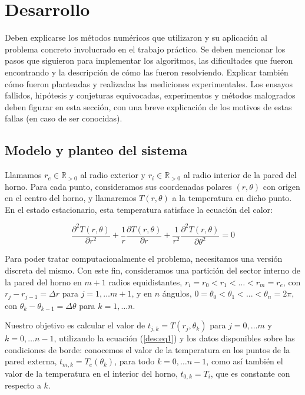 \section{Desarrollo}

  {\color{Gray} Deben explicarse los métodos numéricos que utilizaron y su aplicación al problema concreto involucrado en el trabajo práctico. Se deben mencionar los pasos que siguieron para implementar los algoritmos, las dificultades que fueron encontrando y la descripción de cómo las fueron resolviendo. Explicar también cómo fueron planteadas y realizadas las mediciones experimentales. Los ensayos fallidos, hipótesis y conjeturas equivocadas, experimentos y métodos malogrados deben figurar en esta sección, con una breve explicación de los motivos de estas fallas (en caso de ser conocidas).}

  \subsection{Modelo y planteo del sistema}

    Llamamos $r_e \in \mathbb{R}_{>0}$ al radio exterior y $r_i \in \mathbb{R}_{>0}$ al radio interior de la pared del horno. Para cada punto, consideramos sus coordenadas polares $(r, \theta)$ con origen en el centro del horno, y llamaremos $T(r, \theta)$ a la temperatura en dicho punto. En el estado estacionario, esta temperatura satisface la ecuación del calor:

    \begin{equation} \label{des:eq1}
      \frac{\partial^2 T(r, \theta)}{\partial r^2} + \frac{1}{r} \frac{\partial T(r, \theta)}{\partial r} + \frac{1}{r^2} \frac{\partial^2 T(r, \theta)}{\partial \theta^2} = 0
    \end{equation}

    Para poder tratar computacionalmente el problema, necesitamos una versión discreta del mismo. Con este fin, consideramos una partición del sector interno de la pared del horno en $m + 1$ radios equidistantes, $r_i = r_0 < r_1 < \dots < r_m = r_e$, con $r_j - r_{j-1} = \Delta r$ para $j = 1, \dots m+1$, y en $n$ ángulos, $0 = \theta_0 < \theta_1 < ... < \theta_n = 2\pi$, con $\theta_k - \theta_{k-1} = \Delta \theta$ para $k = 1, \dots n$.

    Nuestro objetivo es calcular el valor de $t_{j,k} = T(r_j, \theta_k)$ para $j = 0, \dots m$ y $k = 0, \dots n-1$, utilizando la ecuación (\ref{des:eq1}) y los datos disponibles sobre las condiciones de borde: conocemos el valor de la temperatura en los puntos de la pared externa, $t_{m,k} = T_e(\theta_k)$, para todo $k = 0, \dots n-1$, como así también el valor de la temperatura en el interior del horno, $t_{0,k} = T_i$, que es constante con respecto a $k$.


